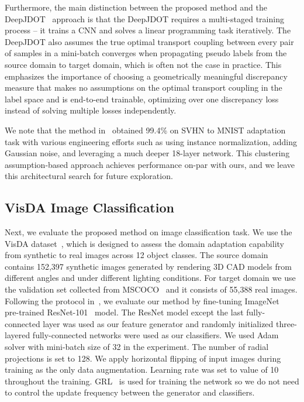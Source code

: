 \documentclass[10pt,twocolumn,letterpaper]{article}
\begin{document}
Furthermore, the main distinction between the proposed method and the DeepJDOT~\cite{damodaran2018deepjdot} approach is that the DeepJDOT requires a multi-staged training process -- it trains a CNN and solves a linear programming task iteratively. The DeepJDOT also assumes the true optimal transport coupling between every pair of samples in a mini-batch converges when propagating pseudo labels from the source domain to target domain, which is often not the case in practice. This emphasizes the importance of choosing a geometrically meaningful discrepancy measure that makes no assumptions on the optimal transport coupling in the label space and is end-to-end trainable, optimizing over one discrepancy loss instead of solving multiple losses independently.

We note that the method in~\cite{shu2018dirt} obtained 99.4\% on SVHN to MNIST adaptation task with various engineering efforts such as using instance normalization, adding Gaussian noise, and leveraging a much deeper 18-layer network. This clustering assumption-based approach achieves performance on-par with ours, and we leave this architectural search for future exploration.



\subsection{VisDA Image Classification}
Next, we evaluate the proposed method on image classification task. We use the VisDA dataset~\cite{visda2017}, which is designed to assess the domain adaptation capability from synthetic to real images across 12 object classes. The source domain contains 152,397 synthetic images generated by rendering 3D CAD models from different angles and under different lighting conditions. For target domain we use the validation set collected from MSCOCO~\cite{lin2014microsoft} and it consists of 55,388 real images.
Following the protocol in~\cite{saito2017maximum}, we evaluate our method by fine-tuning ImageNet~\cite{deng2009imagenet} pre-trained ResNet-101~\cite{he2016deep} model. The ResNet model except the last fully-connected layer was used as our feature generator and randomly initialized three-layered fully-connected networks were used as our classifiers. We used Adam solver with mini-batch size of 32 in the experiment. The number of radial projections  is set to 128. We apply horizontal flipping of input images during training as the only data augmentation. Learning rate was set to value of 10 throughout the training. GRL~\cite{ganin2014unsupervised} is used for training the network so we do not need to control the update frequency between the generator and classifiers.
\end{document}
